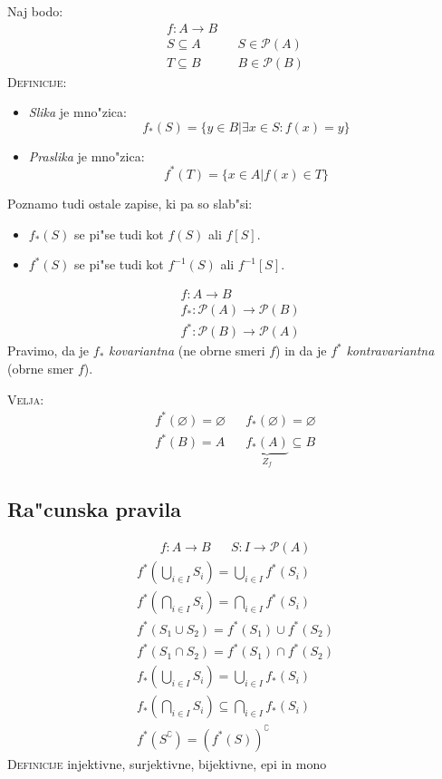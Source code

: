 Naj bodo:
\begin{align*}
f: A \rightarrow B && \\ 
S \subseteq A && S \in \mathcal{P}(A) \\
T \subseteq B && B \in \mathcal{P}(B)
\end{align*}
\textsc{Definicije:}
\begin{itemize}
	\item \emph{Slika} je mno"zica:
	\begin{equation*}
	f_*(S) = \{y \in B | \exists x \in S: f(x) = y\}
	\end{equation*}
	
	\item \emph{Praslika} je mno"zica:
	\begin{equation*}
	f^*(T) = \{x \in A | f(x) \in T\}
	\end{equation*}
\end{itemize}
Poznamo tudi ostale zapise, ki pa so slab"si:
\begin{itemize}
	\item $f_*(S)$ se pi"se tudi kot $f(S)$ ali $f[S]$.
	\item $f^*(S)$ se pi"se tudi kot $f^{-1}(S)$ ali $f^{-1}[S]$.
\end{itemize}
\begin{align*}
&f: A \rightarrow B \\
&f_*: \mathcal{P}(A) \rightarrow \mathcal{P}(B) \\
&f^*: \mathcal{P}(B) \rightarrow \mathcal{P}(A)
\end{align*}
Pravimo, da je $f_*$ \emph{kovariantna} (ne obrne smeri $f$) in da je $f^*$ \emph{kontravariantna} (obrne smer $f$).

\textsc{Velja:}
\begin{align*}
f^*(\varnothing) = \varnothing && f_*(\varnothing) = \varnothing \\
f^*(B) = A && \underbrace{f_*(A)}_{Z_f} \subseteq B
\end{align*}

\subsection{Ra"cunska pravila}
\begin{align*}
f: A \rightarrow B && S: I \rightarrow \mathcal{P}(A)
\end{align*}
\begin{gather*}
	f^*\left(\bigcup_{i \in I}S_i\right) = \bigcup_{i \in I}f^*(S_i) \\
	f^*\left(\bigcap_{i \in I}S_i\right) = \bigcap_{i \in I}f^*(S_i) \\
	f^*(S_1 \cup S_2) = f^*(S_1) \cup f^*(S_2) \\
	f^*(S_1 \cap S_2) = f^*(S_1) \cap f^*(S_2) \\
	f_*\left(\bigcup_{i \in I}S_i\right) = \bigcup_{i \in I}f_*(S_i) \\
	f_*\left(\bigcap_{i \in I}S_i\right) \subseteq \bigcap_{i \in I}f_*(S_i) \\
	f^*(S^\complement) = (f^*(S))^\complement
\end{gather*}
\textsc{Definicije} injektivne, surjektivne, bijektivne, epi in mono

